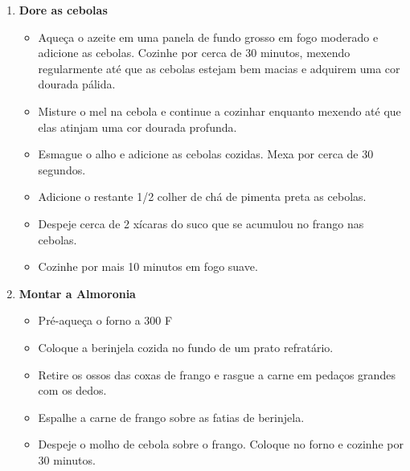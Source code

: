 \documentclass [11pt, papel de carta] {article}
\begin{document}
\begin {description}
\begin {enumerate}
\item {\bf Dore as cebolas}
\begin {itemize}
\item Aqueça o azeite em uma panela de fundo grosso em fogo moderado e adicione as cebolas.
Cozinhe por cerca de 30 minutos, mexendo regularmente até que as cebolas estejam bem macias e adquirem uma cor dourada pálida.
\item Misture o mel na cebola e continue a cozinhar enquanto mexendo até que elas atinjam uma cor dourada profunda.
\item Esmague o alho e adicione as cebolas cozidas. Mexa por cerca de 30 segundos.
\item Adicione o restante 1/2 colher de chá de pimenta preta as cebolas.
\item Despeje cerca de 2 xícaras do suco que se acumulou no frango nas cebolas.
\item Cozinhe por mais 10 minutos em fogo suave.
\end {itemize}
\item {\bf Montar a Almoronia}
\begin {itemize}
\item Pré-aqueça o forno a 300 F
\item Coloque a berinjela cozida no fundo de um prato refratário.
\item Retire os ossos das coxas de frango e rasgue a carne em pedaços grandes com os dedos.
\item Espalhe a carne de frango sobre as fatias de berinjela.
\item Despeje o molho de cebola sobre o frango.
Coloque no forno e cozinhe por 30 minutos.
\end {itemize}
\end {enumerate}
\end {description}
\end{document}
